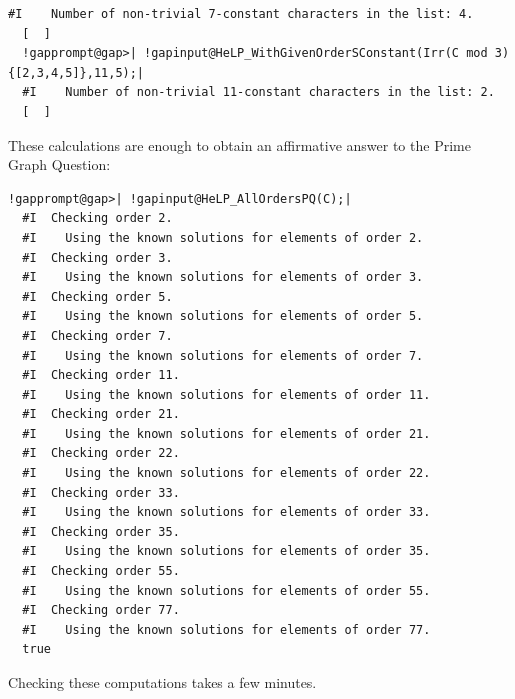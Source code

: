 \documentclass[a4paper,11pt]{report}
\begin{document}
{{\begin{Verbatim}[commandchars=!@|,fontsize=\small,frame=single,label=Example]
  #I    Number of non-trivial 7-constant characters in the list: 4.
  [  ] 
  !gapprompt@gap>| !gapinput@HeLP_WithGivenOrderSConstant(Irr(C mod 3){[2,3,4,5]},11,5);|
  #I    Number of non-trivial 11-constant characters in the list: 2.
  [  ] 
\end{Verbatim}
 These calculations are enough to obtain an affirmative answer to the Prime
Graph Question: 
\begin{Verbatim}[commandchars=!@|,fontsize=\small,frame=single,label=Example]
  !gapprompt@gap>| !gapinput@HeLP_AllOrdersPQ(C);|
  #I  Checking order 2.
  #I    Using the known solutions for elements of order 2.
  #I  Checking order 3.
  #I    Using the known solutions for elements of order 3.
  #I  Checking order 5.
  #I    Using the known solutions for elements of order 5.
  #I  Checking order 7.
  #I    Using the known solutions for elements of order 7.
  #I  Checking order 11.
  #I    Using the known solutions for elements of order 11.
  #I  Checking order 21.
  #I    Using the known solutions for elements of order 21.
  #I  Checking order 22.
  #I    Using the known solutions for elements of order 22.
  #I  Checking order 33.
  #I    Using the known solutions for elements of order 33.
  #I  Checking order 35.
  #I    Using the known solutions for elements of order 35.
  #I  Checking order 55.
  #I    Using the known solutions for elements of order 55.
  #I  Checking order 77.
  #I    Using the known solutions for elements of order 77.
  true
\end{Verbatim}
 Checking these computations takes a few minutes. }

 }

   
\end{document}
